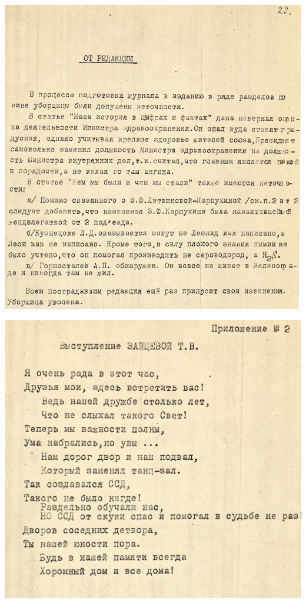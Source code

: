 \noindent
\includegraphics[width=\textwidth]{inc/Vynd/Vynd027}

\newpage

\vspace*{120pt}

\noindent
\includegraphics[width=\textwidth]{inc/Vynd/Vynd028}

\restoregeometry

